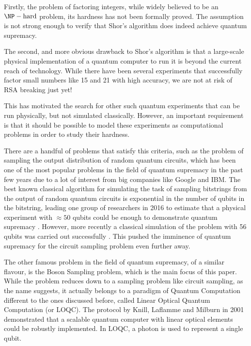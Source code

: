 \documentclass[ %
                    author={Manan Vaswani},
                supervisor={Dr. Raphael Clifford},
                    degree={MEng},
                     title={A multi-core CPU implementation \n of the classical Boson Sampling algorithm},
                  subtitle={},
                      type={},
                      year={2019} ]{dissertation}
\begin{document}
Firstly, the problem of factoring integers, while widely believed to be an $\NP-\text{hard}$ problem, its hardness has not been formally proved. The assumption is not strong enough to verify that Shor's algorithm does indeed achieve quantum supremacy.

The second, and more obvious drawback to Shor's algorithm is that a large-scale physical implementation of a quantum computer to run it is beyond the current reach of technology. While there have been several experiments that successfully factor small numbers like 15 \cite{monz2016} and 21 \cite{vartiainen2004} with high accuracy, we are not at risk of RSA breaking just yet!

This has motivated the search for other such quantum experiments that can be run physically, but not simulated classically. However, an important requirement is that it should be possible to model these experiments as computational problems in order to study their hardness.

There are a handful of problems that satisfy this criteria, such as the problem of sampling the output distribution of random quantum circuits, which has been one of the most popular problems in the field of quantum supremacy in the past few years due to a lot of interest from big companies like Google and IBM. The best known classical algorithm for simulating the task of sampling bitstrings from the output of random quantum circuits is exponential in the number of qubits in the bitstring, leading one group of researchers in 2016 to estimate that a physical experiment with $\approx 50$ qubits could be enough to demonstrate quantum supremacy \cite{boixo2016}. However, more recently a classical simulation of the problem with 56 qubits was carried out successfully \cite{pednault2017}. This pushed the imminence of quantum supremacy for the circuit sampling problem even further away.

The other famous problem in the field of quantum supremacy, of a similar flavour, is the Boson Sampling problem, which is the main focus of this paper. While the problem reduces down to a sampling problem like circuit sampling, as the name suggests, it actually belongs to a paradigm of Quantum Computation different to the ones discussed before, called Linear Optical Quantum Computation (or LOQC). The protocol by Knill, Laflamme and Milburn in 2001 \cite{knill2001} demonstrated that a scalable quantum computer with linear optical elements could be robustly implemented. In LOQC, a photon is used to represent a single qubit.
\end{document}
